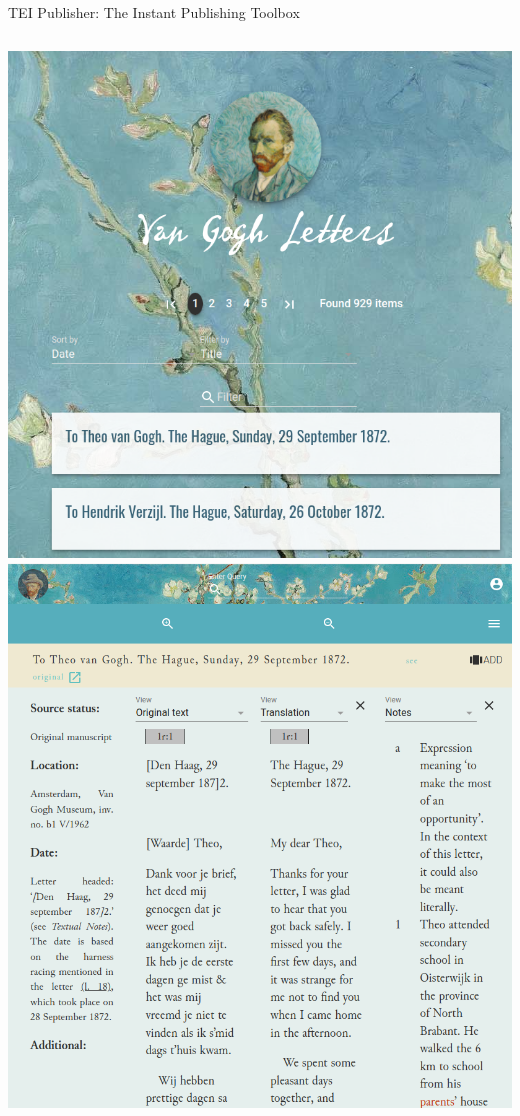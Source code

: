 \begin{frame}[allowframebreaks]{TEI Publisher: The Instant Publishing Toolbox}
    \begin{columns}
    \includegraphics[width=\textwidth]{img/tei-publisher2.png}
    \includegraphics[width=\textwidth]{img/tei-publisher3.png}

\end{columns}
\end{frame}
